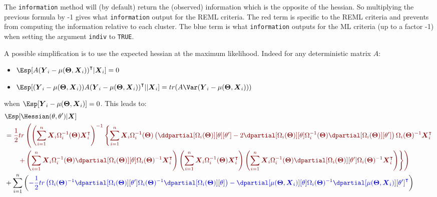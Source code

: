 \documentclass[12pt]{article}
\newcommand{\darkblue}{blue!80!black}
\newcommand{\darkred}{red!50!black}
\newcommand\trans[1]{{#1}^\intercal}%
\newcommand{\param}{\Theta}
\newcommand{\Vparam}{\boldsymbol{\param}}
\newcommand{\VX}{\boldsymbol{X}}
\newcommand{\VY}{\boldsymbol{Y}}
\begin{document}
\bigskip

The \texttt{information} method will (by default) return the (observed)
information which is the opposite of the hessian. So multiplying the
previous formula by -1 gives what \texttt{information} output for the REML
criteria. The red term is specific to the REML criteria and prevents
from computing the information relative to each cluster. The blue term
is what \texttt{information} outputs for the ML criteria (up to a factor -1)
when setting the argument \texttt{indiv} to \texttt{TRUE}.

\bigskip

A possible simplification is to use the expected hessian at the maximum likelihood. Indeed for
any deterministic matrix \(A\):
\begin{itemize}
\item \(\Esp[A \trans{(\VY_i-\mu(\Vparam,\VX_i))}|\VX_i] = 0\)
\item \(\Esp[(\VY_i-\mu(\Vparam,\VX_i)) A \trans{(\VY_i-\mu(\Vparam,\VX_i))}||\VX_i] = tr(A \Var(\VY_i-\mu(\Vparam,\VX_i)))\)
\end{itemize}
when \(\Esp[\VY_i-\mu(\Vparam,\VX_i)]=0\). This leads to:
\begin{align}
 & \Esp[\Hessian(\theta,\theta^{\prime})|\VX] \notag\\ 
 &= \textcolor{\darkred}{ \frac{1}{2} tr \left( \left(\sum_{i=1}^n \VX_i \Omega_i^{-1}(\Vparam) \trans{\VX}_i\right)^{-1}  \left\{ \sum_{i=1}^n \VX_i \Omega_i^{-1}(\Vparam) \left( \ddpartial[\Omega_i(\Vparam)][\theta][\theta^{\prime}] - 2 \dpartial[\Omega_i(\Vparam)][\theta]  \Omega_i^{-1}(\Vparam) \dpartial[\Omega_i(\Vparam)][\theta^{\prime}]\right) \Omega_i(\Vparam)^{-1} \trans{\VX}_i \right.  \right.} \notag \\
 & \textcolor{\darkred}{ \left. \left. \qquad +  \left(\sum_{i=1}^n \VX_i \Omega_i^{-1}(\Vparam) \dpartial[\Omega_i(\Vparam)][\theta] \Omega_i(\Vparam)^{-1} \trans{\VX}_i\right) \left(\sum_{i=1}^n \VX_i \Omega_i^{-1}(\Vparam) \trans{\VX}_i \right) \left(\sum_{i=1}^n \VX_i \Omega_i^{-1}(\Vparam) \dpartial[\Omega_i(\Vparam)][\theta^{\prime}] \Omega_i(\Vparam)^{-1} \trans{\VX}_i\right) \right\} \right) } \notag\\
 & + \sum_{i=1}^n \left( \textcolor{\darkblue}{
- \frac{1}{2} tr\left(\Omega_i(\Vparam)^{-1} \dpartial[\Omega_i(\Vparam)][\theta^{\prime}] \Omega_i(\Vparam)^{-1} \dpartial[\Omega_i(\Vparam)][\theta]\right)
 - \dpartial[\mu(\Vparam,\VX_i)][\theta] \Omega_i(\Vparam)^{-1} \trans{\dpartial[\mu(\Vparam,\VX_i)][\theta^{\prime}]}
 } \right) \label{eq:expectedInfo} 
\end{align}
\end{document}
